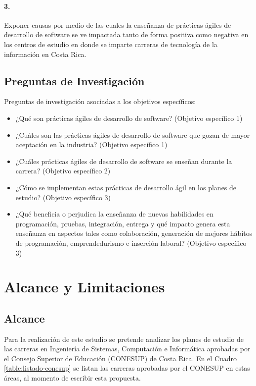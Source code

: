 \paragraph{3.} Exponer causas por medio de las cuales la enseñanza de prácticas ágiles de desarrollo de software se ve impactada tanto de forma positiva como negativa en los centros de estudio en donde se imparte carreras de tecnología de la información en Costa Rica. \label{sec:objetivo-especifico-3}


\subsection{Preguntas de Investigación}
Preguntas de investigación asociadas a los objetivos específicos:
\begin{itemize}
    \item ¿Qué son prácticas ágiles de desarrollo de software? (Objetivo específico 1)
    \item ¿Cuáles son las prácticas ágiles de desarrollo de software que gozan de mayor aceptación en la industria? (Objetivo específico 1)
    \item ¿Cuáles prácticas ágiles de desarrollo de software se enseñan durante la carrera? (Objetivo específico 2)
    \item ¿Cómo se implementan estas prácticas de desarrollo ágil en los planes de estudio? (Objetivo específico 3)    
    \item ¿Qué beneficia o perjudica la enseñanza de nuevas habilidades en programación, pruebas, integración, entrega y qué impacto genera esta enseñanza en aspectos tales como colaboración, generación de mejores hábitos de programación, emprendedurismo e inserción laboral? (Objetivo específico 3)    
\end{itemize}


\section{Alcance y Limitaciones} \label{sec:ch1-alcance}

\subsection{Alcance}

Para la realización de este estudio se pretende analizar los planes de estudio de las carreras en Ingeniería de Sistemas, Computación e Informática aprobadas por el Consejo Superior de Educación (CONESUP) de Costa Rica. En el Cuadro \ref{table:listado-conesup} se listan las carreras aprobadas por el CONESUP en estas áreas, al momento de escribir esta propuesta. 

